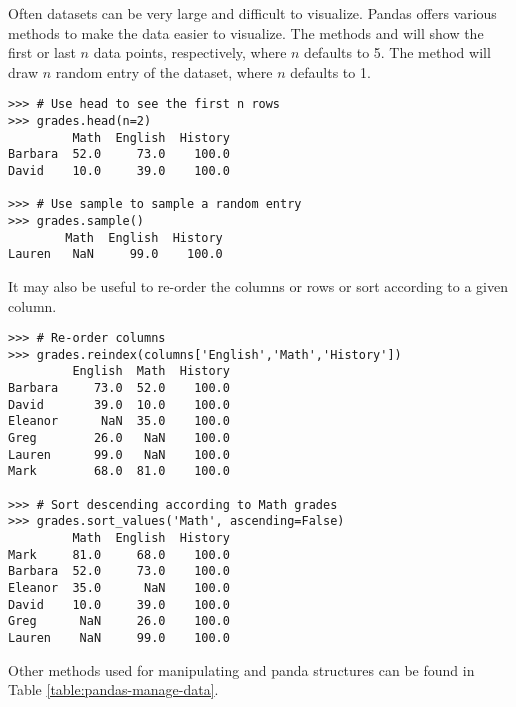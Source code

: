 Often datasets can be very large and difficult to visualize.
Pandas offers various methods to make the data easier to visualize.
The methods  and  will show the first or last $n$ data points, respectively, where $n$ defaults to 5.
The method  will draw $n$ random entry of the dataset, where $n$ defaults to 1.

\begin{lstlisting}
>>> # Use head to see the first n rows
>>> grades.head(n=2)
         Math  English  History
Barbara  52.0     73.0    100.0
David    10.0     39.0    100.0

>>> # Use sample to sample a random entry
>>> grades.sample()
        Math  English  History
Lauren   NaN     99.0    100.0
\end{lstlisting}

It may also be useful to re-order the columns or rows or sort according to a
given column.

\begin{lstlisting}
>>> # Re-order columns
>>> grades.reindex(columns['English','Math','History'])
         English  Math  History
Barbara     73.0  52.0    100.0
David       39.0  10.0    100.0
Eleanor      NaN  35.0    100.0
Greg        26.0   NaN    100.0
Lauren      99.0   NaN    100.0
Mark        68.0  81.0    100.0

>>> # Sort descending according to Math grades
>>> grades.sort_values('Math', ascending=False)
         Math  English  History
Mark     81.0     68.0    100.0
Barbara  52.0     73.0    100.0
Eleanor  35.0      NaN    100.0
David    10.0     39.0    100.0
Greg      NaN     26.0    100.0
Lauren    NaN     99.0    100.0
\end{lstlisting}

Other methods used for manipulating  and  panda structures can be found in Table \ref{table:pandas-manage-data}.

